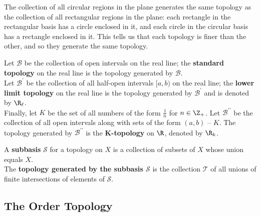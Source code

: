 \begin{remark}
The collection of all circular regions in the plane generates the same topology as the collection of all rectangular regions in the plane:
each rectangle in the rectangular basis has a circle enclosed in it, and each circle in the circular basis has a rectangle enclosed in it. 
This tells us that each topology is finer than the other, and so they generate the same topology.
\end{remark}

\begin{definition}[Topologies on $\R$]
Let $\mathscr{B}$ be the collection of open intervals on the real line; the \textbf{standard topology} on the real line is the topology generated by $\mathscr{B}$. \\

Let $\mathscr{B}^{\prime}$ be the collection of all half-open intervals $[a, b)$ on the real line; the \textbf{lower limit topology} on the real line 
is the topology generated by $\mathscr{B}^{\prime}$ and is denoted by $\R_\ell$. \\

Finally, let $K$ be the set of all numbers of the form $\frac{1}{n}$ for $n \in \Z_+$. Let $\mathscr{B}^{\prime\prime}$ be the collection
of all open intervals along with sets of the form $(a, b) \text{ -- } K$. The topology generated by $\mathscr{B}^{\prime\prime}$ is the \textbf{K-topology} on $\R$, denoted by $\R_k$.
\end{definition}

\begin{definition}
A \textbf{subbasis} $\mathscr{S}$ for a topology on $X$ is a collection of subsets of $X$ whose union equals $X$. \\

The \textbf{topology generated by the subbasis $\mathscr{S}$} is the collection $\mathscr{T}$ of all unions of finite intersections of elements of $\mathscr{S}$.
\end{definition}

\subsection{The Order Topology}

